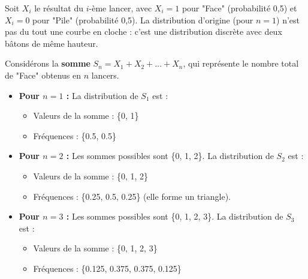 \begin{examplebox}
Soit $X_i$ le résultat du $i$-ème lancer, avec $X_i = 1$ pour "Face" (probabilité 0,5) et $X_i = 0$ pour "Pile" (probabilité 0,5). La distribution d'origine (pour $n=1$) n'est pas du tout une courbe en cloche : c'est une distribution discrète avec deux bâtons de même hauteur.

Considérons la \textbf{somme} $S_n = X_1 + X_2 + \dots + X_n$, qui représente le nombre total de "Face" obtenus en $n$ lancers.

\begin{itemize}
    \item \textbf{Pour $n=1$ :} La distribution de $S_1$ est :
    \begin{itemize}
        \item Valeurs de la somme : \{0, 1\}
        \item Fréquences : \{0.5, 0.5\}
    \end{itemize}
    
    \item \textbf{Pour $n=2$ :} Les sommes possibles sont \{0, 1, 2\}. La distribution de $S_2$ est :
    \begin{itemize}
        \item Valeurs de la somme : \{0, 1, 2\}
        \item Fréquences : \{0.25, 0.5, 0.25\} (elle forme un triangle).
    \end{itemize}
    
    \item \textbf{Pour $n=3$ :} Les sommes possibles sont \{0, 1, 2, 3\}. La distribution de $S_3$ est :
    \begin{itemize}
        \item Valeurs de la somme : \{0, 1, 2, 3\}
        \item Fréquences : \{0.125, 0.375, 0.375, 0.125\}
    \end{itemize}
\end{itemize}

\begin{center}
\end{center}
\end{examplebox}
